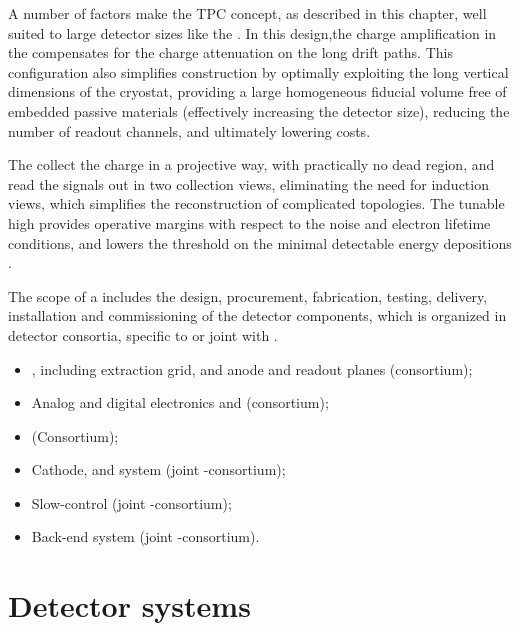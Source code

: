 A number of factors make the \dual TPC concept, as described in this chapter, well suited to large detector sizes like the .
In this design,the charge amplification in the  compensates for the charge attenuation on the long drift paths.  This configuration also simplifies
construction by optimally exploiting the long vertical dimensions of the cryostat, providing a large homogeneous fiducial volume  free of embedded passive materials (effectively increasing the detector size), reducing the number of readout channels,  and ultimately lowering costs.  


The  collect the charge in a projective way,  with practically no dead region, and read the signals out  in two collection views, eliminating the need for  induction views, 
which  simplifies the reconstruction of complicated topologies. The tunable high  provides operative margins with respect to the noise and electron lifetime conditions, and lowers the threshold on the minimal  detectable energy depositions .

The scope of a  includes the design, procurement, fabrication, testing, delivery, installation and
commissioning of the detector components, which is organized in detector consortia, specific to \dual or joint with \single. %

\begin{itemize}
\item {}, including extraction grid,  and anode and readout planes (\dual consortium);
\item Analog and digital electronics and  (\dual consortium); 
\item {} (\dual Consortium);
\item Cathode,  and  system (joint \single{}-\dual consortium);  
\item Slow-control (joint \single{}-\dual consortium); 
\item Back-end  system (joint \single{}-\dual consortium).
\end{itemize}


\section{Detector systems}
\label{sec:fddp-ov-systems}
